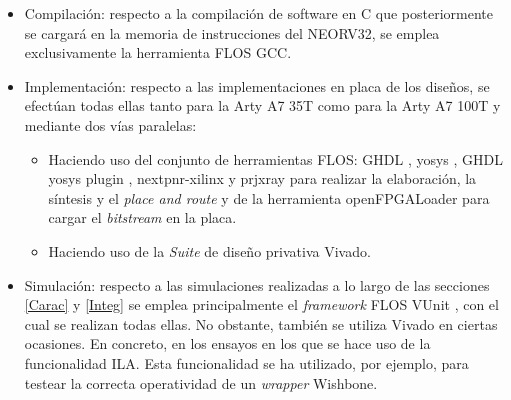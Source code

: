 \begin{itemize}
    \item Compilación: respecto a la compilación de software en C que posteriormente se cargará en la memoria de instrucciones del NEORV32, se emplea exclusivamente la herramienta FLOS GCC.
    \item Implementación: respecto a las implementaciones en placa de los diseños, se efectúan todas ellas tanto para la Arty A7 35T como para la Arty A7 100T y mediante dos vías paralelas:
        \begin{itemize}
            \item Haciendo uso del conjunto de herramientas FLOS: GHDL \cite{gh:ghdl}, yosys \cite{gh:yosys}, GHDL yosys plugin \cite{gh:ghdl-plugin}, nextpnr-xilinx \cite{gh:nextpnr} y prjxray \cite{gh:prjxray} para realizar la elaboración, la síntesis y el \textit{place and route} y de la herramienta openFPGALoader \cite{gh:openFPGALoader} para cargar el \textit{bitstream} en la placa.
            \item Haciendo uso de la \textit{Suite} de diseño privativa Vivado.
        \end{itemize}
    \item Simulación: respecto a las simulaciones realizadas a lo largo de las secciones \ref{Carac} y \ref{Integ} se emplea principalmente el \textit{framework} FLOS VUnit \cite{gh:vunit}, con el cual se realizan todas ellas.
No obstante, también se utiliza Vivado en ciertas ocasiones.  
En concreto, en los ensayos en los que se hace uso de la funcionalidad ILA.
Esta funcionalidad se ha utilizado, por ejemplo, para testear la correcta operatividad de un \textit{wrapper} Wishbone.
\end{itemize} 

